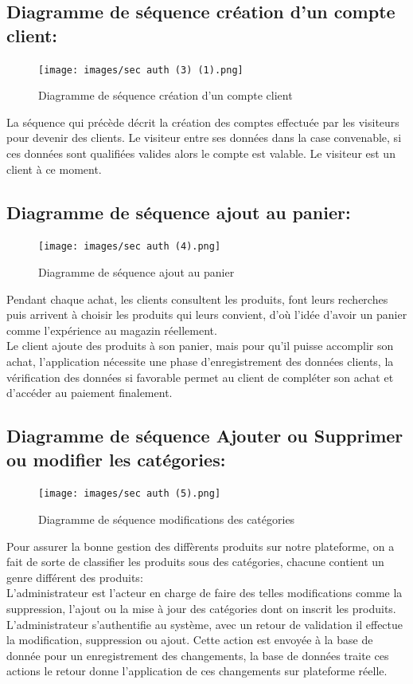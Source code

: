 \documentclass[a4paper]{report}
\begin{document}
\begin{doublespace}
\begin{doublespace}
\begin{doublespace}
\begin{doublespace}
\begin{doublespace}
\subsection{Diagramme de séquence création d'un compte client:}
\begin{figure}[H]
\begin{center}
 \texttt{[image: images/sec auth (3) (1).png]}
 \caption{Diagramme de séquence création d'un compte client}
 \end{center}
\end{figure}
La séquence  qui précède décrit la création des comptes effectuée par les visiteurs pour devenir des clients. Le visiteur entre ses données dans la case convenable, si ces données sont qualifiées valides alors le compte est valable. Le visiteur est un client à ce moment.
\subsection{Diagramme de séquence ajout au panier:}
\begin{figure}[H]
\begin{center}
 \texttt{[image: images/sec auth (4).png]}
 \caption{Diagramme de séquence ajout au panier}
 \end{center}
\end{figure}
Pendant chaque achat, les clients consultent les produits, font leurs recherches puis arrivent à choisir les produits qui leurs convient, d'où l'idée d'avoir un panier comme l'expérience au magazin réellement. \\Le client ajoute des produits à son panier, mais pour qu'il puisse accomplir son achat, l'application nécessite une phase d'enregistrement des données clients, la vérification des données si favorable permet au client de compléter son achat et d'accéder au paiement finalement.

\subsection{Diagramme de séquence Ajouter ou Supprimer ou modifier les catégories:}
\begin{figure}[H]
\begin{center}
 \texttt{[image: images/sec auth (5).png]}
 \caption{Diagramme de séquence modifications des catégories}
 \end{center}
\end{figure}
Pour assurer la bonne gestion des diffèrents produits sur notre plateforme, on a fait de sorte de classifier les produits sous des catégories, chacune contient un genre différent des produits:\\ L'administrateur est l'acteur en charge de faire des telles modifications comme la suppression, l'ajout ou la mise à jour des catégories dont on inscrit les produits. L'administrateur s'authentifie au système, avec un retour de validation il effectue la modification, suppression ou ajout. Cette action est envoyée à la base de donnée pour un enregistrement des changements, la base de données traite ces actions le retour donne l'application de ces changements sur plateforme réelle.

\end{doublespace}
\end{doublespace}
\end{doublespace}
\end{doublespace}
\end{doublespace}
\end{document}
